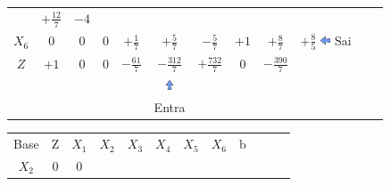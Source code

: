 \begin{frame}
{\begin{table}
\begin{tabular}{c c c c c c c c c c c c}
				& \cellcolor{gray!50} $\scriptstyle +\frac{12}{7}$
				& $ \scriptstyle -4 $  \\
				\cellcolor{blue!100} \color{red} $\scriptstyle X_6$
				& \cellcolor{gray!50} $\scriptstyle 0$
				& \cellcolor{gray!50} $\scriptstyle 0$
				& \cellcolor{gray!50} $\scriptstyle 0$
				& \cellcolor{gray!50} $\scriptstyle +\frac{1}{7}$
				& \cellcolor{red!50} $\scriptstyle +\frac{5}{7}$
				& \cellcolor{gray!50} $\scriptstyle -\frac{5}{7}$
				& \cellcolor{gray!50} $\scriptstyle +1$
				& \cellcolor{gray!50} $\scriptstyle +\frac{8}{7}$
				& $ \scriptstyle +\frac{8}{5}$ \includegraphics[width=0.3cm,height=0.3cm]{setaesquerda.jpg} \scriptsize Sai\\
				\cellcolor{blue!100} \color{white} $\scriptstyle Z$
				& \cellcolor{yellow!50} $\scriptstyle +1$
				& \cellcolor{yellow!50} $\scriptstyle 0$
				& \cellcolor{yellow!50} $\scriptstyle 0$
				& \cellcolor{yellow!50} $\scriptstyle -\frac{61}{7}$
				& \cellcolor{gray!50} $\scriptstyle -\frac{312}{7}$
				& \cellcolor{yellow!50} $\scriptstyle +\frac{732}{7}$
				& \cellcolor{yellow!50} $\scriptstyle 0$ 
				& \cellcolor{gray!50} $\scriptstyle -\frac{390}{7}$  \\
				& & & & & \includegraphics[width=0.3cm,height=0.3cm]{setacima.jpg} \\
				& & & & & \scriptsize Entra \\
			\end{tabular}
		\end{table}			
	}
	{
		\begin{table}		
			\begin{tabular}{c c c c c c c c c c c c}
				\cellcolor{blue!100} \color{white} \scriptsize Base 
				&\cellcolor{blue!100} \color{red} \scriptsize Z 
				&\cellcolor{blue!100} \color{red}   $\scriptstyle X_1$ 
				&\cellcolor{blue!100} \color{red}   $\scriptstyle X_2$ 
				&\cellcolor{blue!100} \color{white} $\scriptstyle X_3$ 
				&\cellcolor{blue!100} \color{red}   $\scriptstyle X_4$ 
				&\cellcolor{blue!100} \color{white} $\scriptstyle X_5$ 
				&\cellcolor{blue!100} \color{white} $\scriptstyle X_6$ 
				&\cellcolor{blue!100} \color{white} \scriptsize b \\
				\cellcolor{blue!100} \color{red} $\scriptstyle X_2$
				& \cellcolor{yellow!50} $\scriptstyle 0$
				& \cellcolor{yellow!50} $\scriptstyle 0$

\end{tabular}
\end{table}}
\end{frame}
